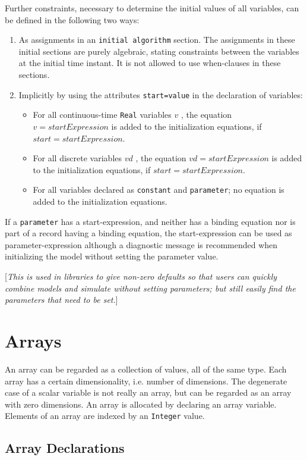 \documentclass[11pt,a4paper,notitlepage]{report}
\begin{document}
Further constraints, necessary to determine the initial values of all variables, can be defined in the following two ways:
\begin{enumerate}
\item As assignments in an \verb"initial algorithm" section. The assignments in these initial sections are purely algebraic, stating constraints between the variables at the initial time instant. It is not allowed to use when-clauses in these sections. 
\item Implicitly by using the attributes \verb"start=value" in the declaration of variables:
	\begin{itemize}
	\item For all continuous-time \verb"Real" variables $v$ , the equation $v = startExpression$ is added to the initialization equations, if $start = startExpression$. 
	\item For all discrete variables $vd$ , the equation $vd = startExpression$ is added to the initialization equations, if $start = startExpression$. 	
	\item For all variables declared as \verb"constant" and \verb"parameter"; no equation is added to the initialization equations. 
	\end{itemize}	 
\end{enumerate}
If a \verb"parameter" has a start-expression, and neither has a binding equation nor is part of a record having a binding equation, the start-expression can be used as parameter-expression although a diagnostic message is recommended when initializing the model without setting the parameter value.

[\emph{This is used in libraries to give non-zero defaults so that users can quickly combine models and simulate without setting parameters; but still easily find the parameters that need to be set.}]

\chapter{Arrays}\label{ch:arrays}

An array can be regarded as a collection of values, all of the same type. Each array has a certain dimensionality, i.e. number of dimensions. The degenerate case of a scalar variable is
not really an array, but can be regarded as an array with zero dimensions. An array is allocated by declaring an array variable. Elements of an array are indexed by an \verb"Integer" value.

\section{Array Declarations}
\end{document}
